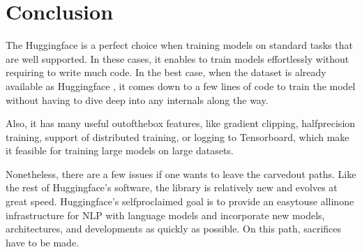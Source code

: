\documentclass[letterpaper,10pt,english]{jupyterBook}
\begin{document}
\begin{sphinxVerbatimInput}
\begin{sphinxVerbatim}[commandchars=\\\{\}]
      \PYG{p}{[}\PYG{p}{]}
        
         

\end{sphinxVerbatim}
\end{sphinxVerbatimInput}


\section{Conclusion}
\label{\detokenize{HuggingFaceTrainer:conclusion}}
\sphinxAtStartPar
The Huggingface  is a perfect choice when training models on standard tasks that are well supported.
In these cases, it enables to train models effortlessly without requiring to write much code.
In the best case, when the dataset is already available as Huggingface , it comes down to a few lines of code to train the model without having to dive deep into any internals along the way.

\sphinxAtStartPar
Also, it has many useful out\sphinxhyphen{}of\sphinxhyphen{}the\sphinxhyphen{}box features, like gradient clipping, half\sphinxhyphen{}precision training, support of distributed training, or logging to Tensorboard, which make it feasible for training large models on large datasets.

\sphinxAtStartPar
Nonetheless, there are a few issues if one wants to leave the carved\sphinxhyphen{}out paths.
Like the rest of Huggingface’s software, the  library is relatively new and evolves at great speed.
Huggingface’s self\sphinxhyphen{}proclaimed goal is to provide an easy\sphinxhyphen{}to\sphinxhyphen{}use all\sphinxhyphen{}in\sphinxhyphen{}one infrastructure for NLP with language models and incorporate new models, architectures, and developments as quickly as possible.
On this path, sacrifices have to be made.
\end{document}

